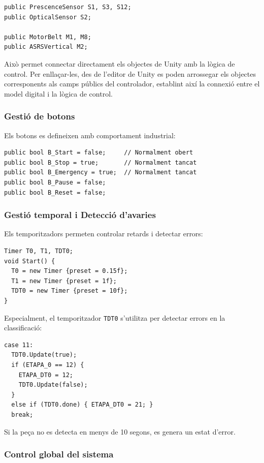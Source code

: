 \documentclass[a4paper,11pt,DIV=13,headings=normal,abstract=true,twoside=semi]{article}
\begin{document}
\begin{lstlisting}[style=simple]
public PrescenceSensor S1, S3, S12;
public OpticalSensor S2;

public MotorBelt M1, M8;
public ASRSVertical M2;
\end{lstlisting}

Això permet connectar directament els objectes de Unity amb la lògica de control. Per enllaçar-les, des de l'editor de Unity es poden arrossegar els objectes corresponents als camps públics del controlador, establint així la connexió entre el model digital i la lògica de control.


\subsubsection*{Gestió de botons}

Els botons es defineixen amb comportament industrial:

\begin{lstlisting}[style=simple]
public bool B_Start = false;     // Normalment obert
public bool B_Stop = true;       // Normalment tancat
public bool B_Emergency = true;  // Normalment tancat
public bool B_Pause = false;
public bool B_Reset = false; 
\end{lstlisting}


\subsubsection*{Gestió temporal i Detecció d'avaries}

Els temporitzadors permeten controlar retards i detectar errors:

\begin{lstlisting}[style=simple]
Timer T0, T1, TDT0;
void Start() {
  T0 = new Timer {preset = 0.15f};
  T1 = new Timer {preset = 1f};
  TDT0 = new Timer {preset = 10f};
}
\end{lstlisting}

Especialment, el temporitzador \texttt{TDT0} s'utilitza per detectar errors en la classificació: 


\begin{lstlisting}[style=simple]
case 11:
  TDT0.Update(true);
  if (ETAPA_0 == 12) {
    ETAPA_DT0 = 12;
    TDT0.Update(false);
  }
  else if (TDT0.done) { ETAPA_DT0 = 21; }
  break;
\end{lstlisting}

Si la peça no es detecta en menys de 10 segons, es genera un estat d'error.
\subsubsection{Control global del sistema}
\end{document}
